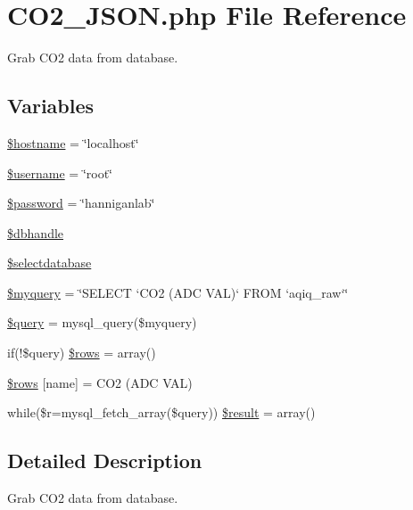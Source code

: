 \hypertarget{_c_o2___j_s_o_n_8php}{}\section{C\+O2\+\_\+\+J\+S\+O\+N.\+php File Reference}
\label{_c_o2___j_s_o_n_8php}


Grab C\+O2 data from database.  


\subsection*{Variables}
\begin{DoxyCompactItemize}
\item 
\hyperlink{_c_o2___j_s_o_n_8php_a8bf9ffb42ed554b203b55377d1fc9aa4}{\$hostname} = \char`\"{}localhost\char`\"{}
\item 
\hyperlink{_c_o2___j_s_o_n_8php_a0eb82aa5f81cf845de4b36cd653c42cf}{\$username} = \char`\"{}root\char`\"{}
\item 
\hyperlink{_c_o2___j_s_o_n_8php_a607686ef9f99ea7c42f4f3dd3dbb2b0d}{\$password} = \char`\"{}hanniganlab\char`\"{}
\item 
\hyperlink{_c_o2___j_s_o_n_8php_a013f690a9cf598d1498e72aa8aa8a8d2}{\$dbhandle}
\item 
\hyperlink{_c_o2___j_s_o_n_8php_a3a00cb9dd022e8ab0cdfe17aad984a14}{\$selectdatabase}
\item 
\hyperlink{_c_o2___j_s_o_n_8php_a8ff37acfddb2efb7962bb94d1c6d0d1c}{\$myquery} = \char`\"{}S\+E\+L\+E\+CT `C\+O2 (A\+DC V\+AL)` F\+R\+OM `aqiq\+\_\+raw`\char`\"{}
\item 
\hyperlink{_c_o2___j_s_o_n_8php_af59a5f7cd609e592c41dc3643efd3c98}{\$query} = mysql\+\_\+query(\$myquery)
\item 
if(!\$query) \hyperlink{_c_o2___j_s_o_n_8php_a9d560e904e6665a6ee21f86a65c1ef8e}{\$rows} = array()
\item 
\hyperlink{_c_o2___j_s_o_n_8php_a6384d385f2f9c3f6bcad27ed87e67106}{\$rows} \mbox{[}\textquotesingle{}name\textquotesingle{}\mbox{]} = \textquotesingle{}C\+O2 (A\+DC V\+AL)\textquotesingle{}
\item 
while(\$r=mysql\+\_\+fetch\+\_\+array(\$query)) \hyperlink{_c_o2___j_s_o_n_8php_a9148136d1e11f768be4f805d7e567da2}{\$result} = array()
\end{DoxyCompactItemize}


\subsection{Detailed Description}
Grab C\+O2 data from database. 

